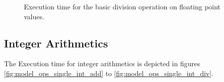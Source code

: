 \begin{figure}[p]
	\begin{center}
		\caption{Execution time for the basic division operation on floating point values.}
		\label{fig:model_ops_single_float_div}
	\end{center}
\end{figure}

\subsection{Integer Arithmetics}
The Execution time for integer arithmetics is depicted in figures \ref{fig:model_ops_single_int_add} to \ref{fig:model_ops_single_int_div}.

